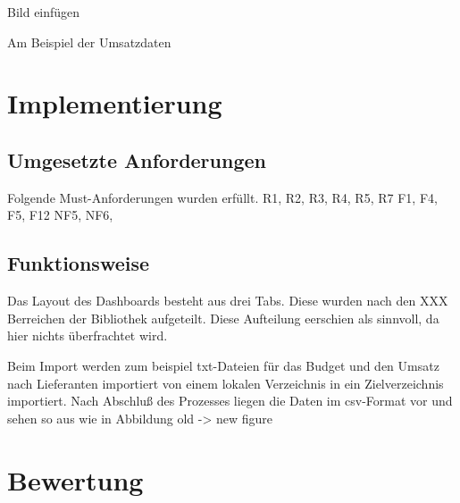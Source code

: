     Bild einfügen
    

    Am Beispiel der Umsatzdaten 
    

\section{Implementierung}

  

    \subsection{Umgesetzte Anforderungen}
    Folgende Must-Anforderungen wurden erfüllt.
    R1, R2, R3, R4, R5, R7
    F1, F4, F5, F12
    NF5, NF6, 
    \subsection{Funktionsweise}
    Das Layout des Dashboards besteht aus drei Tabs. Diese wurden nach den XXX Berreichen der Bibliothek aufgeteilt. Diese Aufteilung eerschien als sinnvoll,
    da hier nichts überfrachtet wird.

    Beim Import werden zum beispiel txt-Dateien für das Budget und den Umsatz nach Lieferanten importiert von einem lokalen Verzeichnis
    in ein Zielverzeichnis importiert. Nach Abschluß des Prozesses liegen die Daten im csv-Format vor und sehen so aus wie in Abbildung
    old -> new
    figure
    
     



\section{Bewertung}
